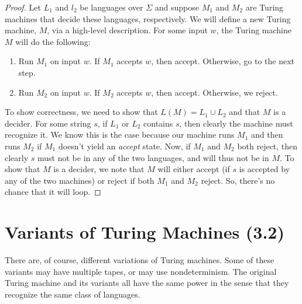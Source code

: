 \documentclass[letterpaper]{article}
\begin{document}
\begin{mdframed}[nobreak=true]
    \begin{proof}
        Let $L_1$ and $l_2$ be languages over $\Sigma$ and suppose $M_1$ and $M_2$ are Turing machines that decide these languages, respectively. We will define a new Turing machine, $M$, via a high-level description. For some input $w$, the Turing machine $M$ will do the following: 
        \begin{enumerate}
            \item Run $M_1$ on input $w$. If $M_1$ accepts $w$, then accept. Otherwise, go to the next step. 
            \item Run $M_2$ on input $w$. If $M_2$ accepts $w$, then accept. Otherwise, we reject. 
        \end{enumerate} 
        To show correctness, we need to show that $L(M) = L_1 \cup L_2$ and that $M$ is a decider. For some string $s$, if $L_1$ or $L_2$ contains $s$, then clearly the machine must recognize it. We know this is the case because our machine runs $M_1$ and then runs $M_2$ if $M_1$ doesn't yield an \emph{accept} state. Now, if $M_1$ and $M_2$ both reject, then clearly $s$ must not be in any of the two languages, and will thus not be in $M$. To show that $M$ is a decider, we note that $M$ will either accept (if $s$ is accepted by any of the two machines) or reject if both $M_1$ and $M_2$ reject. So, there's no chance that it will loop.  
    \end{proof}
\end{mdframed}









































\newpage 
\section{Variants of Turing Machines (3.2)}
There are, of course, different variations of Turing machines. Some of these variants may have multiple tapes, or may use nondeterminism. The original Turing machine and its variants all have the same power in the sense that they recognize the same class of languages. 
\end{document}
